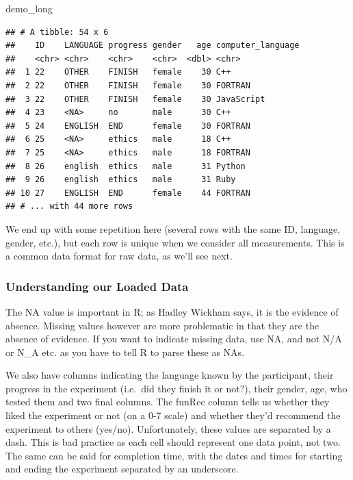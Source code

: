 \documentclass[
]{book}
\newenvironment{Shaded}{\begin{snugshade}}{\end{snugshade}}
\newcommand{\NormalTok}[1]{#1}
\begin{document}
\begin{Shaded}
\begin{Highlighting}[]
\NormalTok{demo\_long}
\end{Highlighting}
\end{Shaded}

\begin{verbatim}
## # A tibble: 54 x 6
##    ID    LANGUAGE progress gender   age computer_language
##    <chr> <chr>    <chr>    <chr>  <dbl> <chr>            
##  1 22    OTHER    FINISH   female    30 C++              
##  2 22    OTHER    FINISH   female    30 FORTRAN          
##  3 22    OTHER    FINISH   female    30 JavaScript       
##  4 23    <NA>     no       male      30 C++              
##  5 24    ENGLISH  END      female    30 FORTRAN          
##  6 25    <NA>     ethics   male      18 C++              
##  7 25    <NA>     ethics   male      18 FORTRAN          
##  8 26    english  ethics   male      31 Python           
##  9 26    english  ethics   male      31 Ruby             
## 10 27    ENGLISH  END      female    44 FORTRAN          
## # ... with 44 more rows
\end{verbatim}

We end up with some repetition here (several rows with the same ID, language, gender, etc.), but each row is unique when we consider all measurements. This is a common data format for raw data, as we'll see next.

\hypertarget{understanding-our-loaded-data}{%
\subsubsection{Understanding our Loaded Data}\label{understanding-our-loaded-data}}

The NA value is important in R; as Hadley Wickham says, it is the evidence of absence. Missing values however are more problematic in that they are the absence of evidence. If you want to indicate missing data, use NA, and not N/A or N\_A etc. as you have to tell R to parse these as NAs.

We also have columns indicating the language known by the participant, their progress in the experiment (i.e.~did they finish it or not?), their gender, age, who tested them and two final columns. The funRec column tells us whether they liked the experiment or not (on a 0-7 scale) and whether they'd recommend the experiment to others (yes/no). Unfortunately, these values are separated by a dash. This is bad practice as each cell should represent one data point, not two. The same can be said for completion time, with the dates and times for starting and ending the experiment separated by an underscore.
\end{document}
